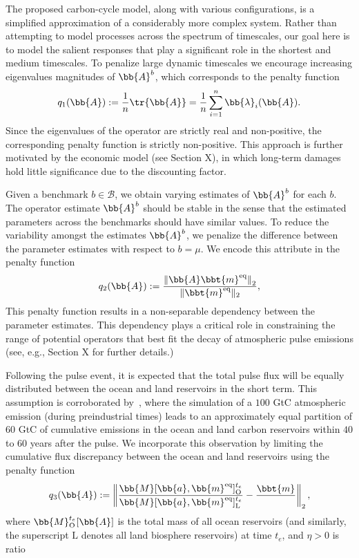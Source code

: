 The proposed carbon-cycle model, along with various configurations, is a simplified approximation of a considerably more complex system. 
Rather than attempting to model processes across the spectrum of timescales, our goal here is to model the salient responses that play a significant role in the shortest and medium timescales. 
To penalize large dynamic timescales we encourage increasing eigenvalues magnitudes of $\bb{A}^b$, which corresponds to the penalty function
%
\begin{align}\label{eq:clim_model.7}
	q_1(\bb{A}) := \frac{1}{n} \tr{\bb{A}} = \frac{1}{n}\sum_{i=1}^n \bb{\lambda}_i(\bb{A}).
\end{align}
%
Since the eigenvalues of the operator are strictly real and non-positive, the corresponding penalty function is strictly non-positive. 
This approach is further motivated by the economic model (see Section X), in which long-term damages hold little significance due to the discounting factor.

Given a benchmark $b \in \mathcal{B}$, we obtain varying estimates of $\bb{A}^{b}$ for each $b$. 
The operator estimate $\bb{A}^{b}$ should be stable in the sense that the estimated parameters across the benchmarks should have similar values.
To reduce the variability amongst the estimates $\bb{A}^{b}$, we penalize the difference between the parameter estimates with respect to $b=\mu$.
We encode this attribute in the penalty function 
%
\begin{align}\label{eq:clim_model.6}
	q_2(\bb{A}) :=  \frac{ \left \| \bb{A} \bbt{m}^{\text{eq}} \right \|_2 }{\| \bbt{m}^{\text{eq}} \|_2 } ,
\end{align}
%
This penalty function results in a non-separable dependency between the parameter estimates. 
This dependency plays a critical role in constraining the range of potential operators that best fit the decay of atmospheric pulse emissions (see, e.g., Section X for further details.)


Following the pulse event, it is expected that the total pulse flux will be equally distributed between the ocean and land reservoirs in the short term. 
This assumption is corroborated by~\cite{joos2013carbon}, where the simulation of a $100$ GtC atmospheric emission (during preindustrial times) leads to an approximately equal partition of $60$ GtC of cumulative emissions in the ocean and land carbon reservoirs within $40$ to $60$ years after the pulse. 
We incorporate this observation by limiting the cumulative flux discrepancy between the ocean and land reservoirs using the penalty function
\begin{align}\label{eq:clim_model.8}
	q_3(\bb{A}) := \left \| \frac{  
	\bb{M}[ \bb{a},\bb{m}^{\text{eq}} ]_{\text{O}}^{t_e}
	}{
	\bb{M}[ \bb{a},\bb{m}^{\text{eq}} ]_{\text{L}}^{t_e}} - \frac{\bbt{m}}{}  \right \|_2,
\end{align}
%
where $\bb{M}^{t_e}_{\text{O}}[\bb{A}]$ is the total mass of all ocean reservoirs (and similarly, the superscript $\text{L}$ denotes all land biosphere reservoirs) at time $t_e$, and $\eta>0$ is ratio  


